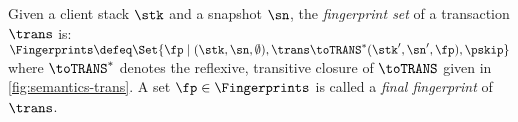 

\begin{definition}
Given a client stack $\stk$ and a snapshot $\sn$, the \emph{fingerprint set} of a transaction $\trans$ is:
\(
\Fingerprints \defeq \Set{\fp \mid (\stk, \sn, \emptyset), \trans \toTRANS^* (\stk', \sn', \fp), \pskip }
\)
where $\toTRANS^*$ denotes the reflexive, transitive closure of $\toTRANS$ given in \cref{fig:semantics-trans}.  
A set $\fp \in \Fingerprints$ is called a \emph{final fingerprint} of $\trans$. 
\end{definition}
\noindent 

